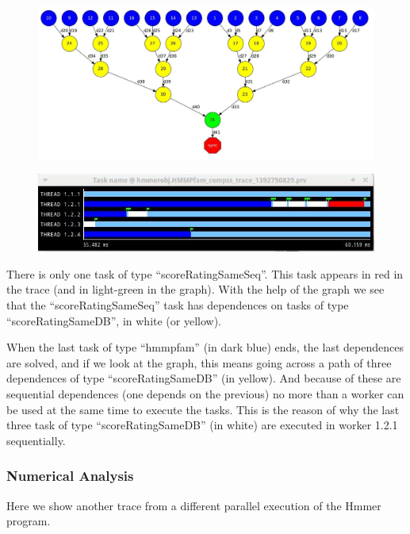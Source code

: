\begin{figure}[ht!]
  \centering
    \includegraphics[width=1.0\textwidth]{./Sections/7_Tracing/Figures/9.jpeg}
\end{figure}

\begin{figure}[ht!]
  \centering
    \includegraphics[width=1.0\textwidth]{./Sections/7_Tracing/Figures/10.jpeg}
\end{figure}


There is only one task of type ``scoreRatingSameSeq''. This task appears in red in the trace 
(and in light-green in the graph). With the help of the graph we see that the ``scoreRatingSameSeq'' 
task has dependences on tasks of type ``scoreRatingSameDB'', in white (or yellow).

When the last task of type ``hmmpfam'' (in dark blue) ends, the last dependences are solved, 
and if we look at the graph, this means going across a path of three dependences of type 
``scoreRatingSameDB'' (in yellow). And because of these are sequential dependences (one depends 
on the previous) no more than a worker can be used at the same time to execute the tasks. 
This is the reason of why the last three task of type ``scoreRatingSameDB'' (in white) are 
executed in worker 1.2.1 sequentially.

\subsubsection{Numerical Analysis}
Here we show another trace from a different parallel execution of the Hmmer program.
 
